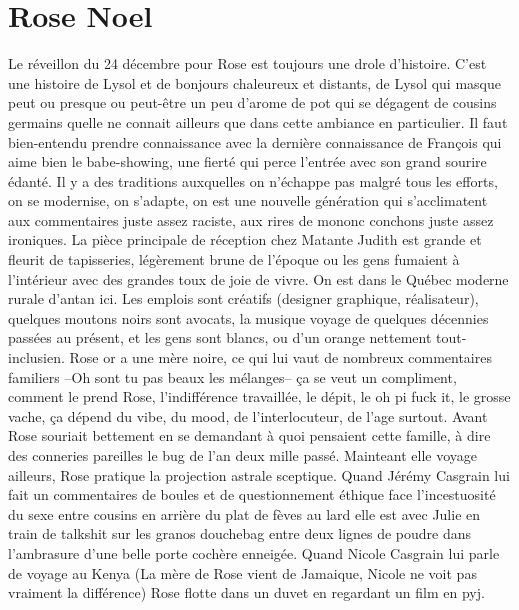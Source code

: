 



\section{Rose Noel}

Le réveillon du 24 décembre pour Rose est toujours une drole d'histoire. C'est
une histoire de Lysol et de bonjours chaleureux et distants, de Lysol qui
masque peut ou presque ou peut-être un peu d'arome de pot qui se dégagent de
cousins germains quelle ne connait ailleurs que dans cette ambiance en
particulier. Il faut bien-entendu prendre connaissance avec la dernière
connaissance de François qui aime bien le babe-showing, une fierté qui perce
l'entrée avec son grand sourire édanté. Il y a des traditions auxquelles on
n'échappe pas malgré tous les efforts, on se modernise, on s'adapte, on est une
nouvelle génération qui s'acclimatent aux commentaires juste assez raciste, aux
rires de mononc conchons juste assez ironiques. La pièce principale de
réception chez Matante Judith est grande et fleurit de tapisseries, légèrement
brune de l'époque ou les gens fumaient à l'intérieur avec des grandes toux de
joie de vivre. On est dans le Québec moderne rurale d'antan ici.  Les emplois
sont créatifs (designer graphique, réalisateur), quelques moutons noirs sont
avocats, la musique voyage de quelques décennies passées au présent, et les
gens sont blancs, ou d'un orange nettement tout-inclusien. Rose or a une mère
noire, ce qui lui vaut de nombreux commentaires familiers --Oh sont tu pas
beaux les mélanges-- ça se veut un compliment, comment le prend Rose,
l'indifférence travaillée, le dépit, le oh pi fuck it, le grosse vache, ça
dépend du vibe, du mood, de l'interlocuteur, de l'age surtout. Avant Rose
souriait bettement en se demandant à quoi pensaient cette famille, à dire des
conneries pareilles le bug de l'an deux mille passé. Mainteant elle voyage
ailleurs, Rose pratique la projection astrale sceptique. Quand Jérémy Casgrain
lui fait un commentaires de boules et de questionnement éthique face
l'incestuosité du sexe entre cousins en arrière du plat de fèves au lard elle
est avec Julie en train de talkshit sur les granos douchebag entre deux lignes
de poudre dans l'ambrasure d'une belle porte cochère enneigée. Quand Nicole
Casgrain lui parle de voyage au Kenya (La mère de Rose vient de Jamaique,
Nicole ne voit pas vraiment la différence) Rose flotte dans un duvet en
regardant un film en pyj. 




